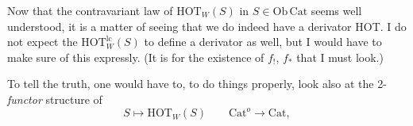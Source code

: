 \documentclass[11pt]{article}
\newcommand{\msp}[1]{\marginpar{\footnotesize [#1]}}
\newcommand{\HOT}{\mathrm{HOT}}
\newcommand{\Cat}{\mathrm{Cat}}
\begin{document}
Now that the contravariant law of $\HOT_W(S)$ in $S \in \mathrm{Ob}\,\Cat$ seems well understood, it is a matter of seeing that we do indeed have a derivator HOT. I do not expect the $\HOT_W^{\mathrm{lc}}(S)$
\msp{page 128}
to define a derivator as well, but I would have to make sure of this expressly. (It is for the existence of $f_!$, $f_*$ that I must look.) %

To tell the truth, one would have to, to do things properly, look also at the 2-\textit{functor} structure of
\[
S \longmapsto \HOT_W(S) \qquad \Cat^o \longrightarrow \Cat,
\]
\end{document}
